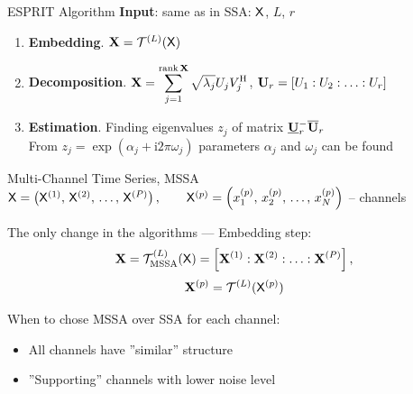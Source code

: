 \documentclass[pdf, unicode, ucs, notheorems]{beamer}
\theoremstyle{definition}
\begin{document}
\begin{frame}{ESPRIT Algorithm}
  \textbf{Input}: same as in SSA: $\mathsf{X}$, $L$, $r$
  \begin{enumerate}
    \item \textbf{Embedding}. $\mathbf{X} = \mathcal{T}^{(L)}(\mathsf{X})$
    \item \textbf{Decomposition}.
      $\displaystyle\mathbf{X} = \sum_{j=1}^{\operatorname{rank}\mathbf{X}}
      \sqrt{\lambda_j} U_j V_j^{\mathrm{H}}$,
      $\mathbf{U}_r = \left[U_1: U_2: \ldots: U_r\right]$
    \item \textbf{Estimation}. Finding eigenvalues $z_j$ of matrix
      $\underline{\mathbf{U}}_r^{-}\overline{\mathbf{U}}_r$ \\ \smallskip
      From $z_j = \exp(\alpha_j + \mathrm{i}2\pi\omega_j)$
      parameters $\alpha_j$ and $\omega_j$ can be found
  \end{enumerate}
\end{frame}

\begin{frame}{Multi-Channel Time Series, MSSA}
  $\mathsf{X} = \left(\mathsf{X}^{(1)},\, \mathsf{X}^{(2)}, \, \ldots,\,
  \mathsf{X}^{(P)}\right), \qquad\mathsf{X}^{(p)} = \left(x_1^{(p)}, \, x_2^{(p)},\,
  \ldots,\,  x_N^{(p)}\right)$ -- channels
  \vspace{0.4cm}

  The only change in the algorithms --- Embedding step:
  \[
    \mathbf{X} = \mathcal{T}_{\textrm{MSSA}}^{(L)}(\mathsf{X}) = \left[\mathbf{X}^{(1)} :
    \mathbf{X}^{(2)}: \ldots : \mathbf{X}^{(P)}\right],
  \]
  \[
    \mathbf{X}^{(p)} = \mathcal{T}^{(L)}(\mathsf{X}^{(p)})
  \]
  \vspace{0.4cm}

  When to chose MSSA over SSA for each channel:
  \begin{itemize}
    \item All channels have ''similar'' structure
    \item ''Supporting'' channels with lower noise level
  \end{itemize}
\end{frame}
\end{document}
